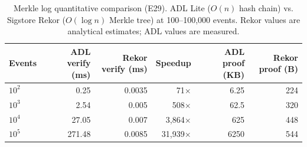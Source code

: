 \begin{table}[htbp]
\centering
\footnotesize
\caption{Merkle log quantitative comparison (E29). ADL Lite ($O(n)$ hash chain) vs. Sigstore Rekor ($O(\log n)$ Merkle tree) at 100--100,000 events. Rekor values are analytical estimates; ADL values are measured.}
\label{tab:e29-results}
\begin{tabular}{@{}lrrrrr@{}}
\toprule
\textbf{Events} & \textbf{ADL verify (ms)} & \textbf{Rekor verify (ms)} & \textbf{Speedup} & \textbf{ADL proof (KB)} & \textbf{Rekor proof (B)} \\
\midrule
$10^2$ & 0.25 & 0.0035 & 71$\times$ & 6.25 & 224 \\
$10^3$ & 2.54 & 0.005 & 508$\times$ & 62.5 & 320 \\
$10^4$ & 27.05 & 0.007 & 3,864$\times$ & 625 & 448 \\
$10^5$ & 271.48 & 0.0085 & 31,939$\times$ & 6250 & 544 \\
\bottomrule
\end{tabular}
\end{table}
